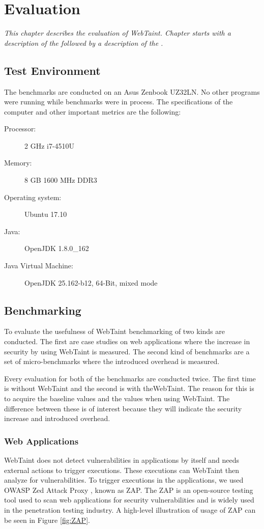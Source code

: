 \chapter{Evaluation}
\label{Evaluation}
\textit{This chapter describes the evaluation of WebTaint. Chapter starts with a description of the \textit{} followed by a description of the \textit{}.}



\section{Test Environment}
\label{TestEnvironment}
The benchmarks are conducted on an Asus Zenbook UZ32LN. No other programs were running while benchmarks were in process. The specifications of the computer and other important metrics are the following:

\begin{description}
    \item [Processor:] 2 GHz i7-4510U
    \item [Memory:] 8 GB 1600 MHz DDR3
    \item [Operating system:] Ubuntu 17.10
    \item [Java:] OpenJDK 1.8.0\_162
    \item [Java Virtual Machine:] OpenJDK 25.162-b12, 64-Bit, mixed mode
\end{description}



\section{Benchmarking}
\label{Benchmarking}
To evaluate the usefulness of WebTaint benchmarking of two kinds are conducted. The first are case studies on web applications where the increase in security by using WebTaint is measured. The second kind of benchmarks are a set of micro-benchmarks where the introduced overhead is measured.

Every evaluation for both of the benchmarks are conducted twice. The first time is without WebTaint and the second is with theWebTaint. The reason for this is to acquire the baseline values and the values when using WebTaint. The difference between these is of interest because they will indicate the security increase and introduced overhead.



\subsection{Web Applications}
WebTaint does not detect vulnerabilities in applications by itself and needs external actions to trigger executions. These executions can WebTaint then analyze for vulnerabilities. To trigger executions in the applications, we used OWASP Zed Attack Proxy \parencite{zap}, known as ZAP. The ZAP is an open-source testing tool used to scan web applications for security vulnerabilities and is widely used in the penetration testing industry. A high-level illustration of usage of ZAP can be seen in Figure \ref{fig:ZAP}. 

